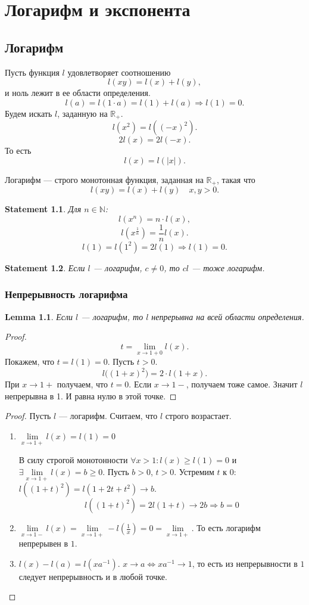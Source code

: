 \documentclass[11pt]{book}
\newcommand{\N}{\mathbb{N}}
\newcommand{\R}{\mathbb{R}}
\renewcommand{\ge}{\geqslant}
\theoremstyle{definition}
\theoremstyle{plain}
\theoremstyle{plain}
\newtheorem*{lm}{Lemma}
\newtheorem*{st}{Statement}
\theoremstyle{definition}
\theoremstyle{remark}
\begin{document}
\chapter{Логарифм и экспонента}
\section{Логарифм}
Пусть функция $ l$ удовлетворяет соотношению
\[
    l(xy) = l(x)+l(y)
,\]
и ноль лежит в ее области определения.
\[
    l(a) = l(1 \cdot  a) = l(1) + l(a) \Longrightarrow l(1) = 0
.\]
Будем искать $ l$, заданную на $ \R_{+}$.
\[
    l(x^2) = l((-x)^2)
.\]
\[
    2l(x) = 2 l(-x)
.\]
То есть \[
    l(x) = l(|x|)
.\]
\begin{defn}
    Логарифм --- строго монотонная функция, заданная на $ \R_{+}$, такая что \[
	l(xy) = l(x) + l(y) \quad x, y >0
    .\]
\end{defn}
\begin{st}
    Для $ n \in  \N$:
    \[
	l(x^{n}) = n\cdot l(x)
    ,\]
    \[
	l(x^{\frac{1}{n}}) = \frac{1}{n} l(x)
    .\]
    \[
	l(1) = l(1^2) = 2 l(1) \Longrightarrow l(1) = 0
    .\]
\end{st}
\begin{st}
    Если $ l$ --- логарифм, $ c\ne 0$, то $ cl$ --- тоже логарифм.
\end{st}
\subsection{Непрерывность логарифма}
\begin{lm}
    Если $ l$ --- логарифм, то $ l$   непрерывна на всей области определения.
\end{lm}
\begin{proof}
    \[
	t = \lim_{x \to 1 + 0} l(x)
    .\]
    Покажем, что $ t = l(1) = 0$.
    Пусть  $ t>0$. \[
	l\bigl((1+ x)^{2}\bigr) = 2 \cdot  l(1+ x)
    .\]
    При $ x \to 1+$ получаем, что $ t=0$.
    Если  $ x \to  1-$, получаем тоже самое. Значит $l$   непрерывна в 1.
    И равна нулю в этой точке.
\end{proof}
\begin{proof}
    Пусть $ l$ --- логарифм. Считаем, что $ l$ строго возрастает.
\begin{enumerate}
\item $\lim\limits_{x \to 1 + }{l(x)} = l(1) = 0$

 В силу строгой монотонности $ \forall x > 1: l(x) \ge  l(1) = 0$ и $\exists \lim\limits_{x \to 1 + }{l(x)} = b \ge 0$.
 Пусть $b > 0$, $t > 0$. Устремим $ t$ к $ 0$: $l((1 + t)^2) = l(1 + 2t + t^2) \to b$.  $$l((1 + t)^2) = 2l(1 + t) \to 2b \Longrightarrow  b = 0$$

\item $\lim\limits_{x \to 1 - }{l(x)} = \lim\limits_{x \to 1 + }-l\left(\frac{1}{x}\right) = 0 = \lim\limits_{x \to  1+}$. То есть логарифм непрерывен в $1$.

\item $l(x) - l(a) = l(x a^{-1})$.  $x \to a \Longleftrightarrow  xa^{-1} \to 1$, то есть из непрерывности в $1$ следует непрерывность  и в любой точке.
\end{enumerate}
\end{proof}
\end{document}

